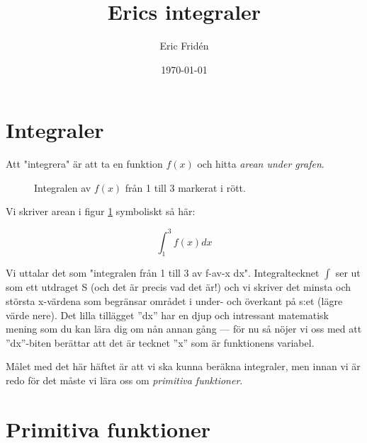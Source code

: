 \documentclass[a4paper,12pt]{article}
\title{Erics integraler}
\author{Eric Fridén}
\date{\today}
\begin{document}
\doublespacing
\maketitle

\section{Integraler}
Att "integrera" är att ta en funktion $f(x)$ och hitta \emph{arean under grafen}. 

\begin{figure}[h]
    \centering
    \caption{Integralen av $f(x)$ från 1 till 3 markerat i rött.}
    \label{fig:1}
\end{figure}

Vi skriver arean i figur \ref{fig:1} symboliskt så här: 

\[ \int_1^3 f(x)dx \] 

Vi uttalar det som "integralen från 1 till 3 av f-av-x dx". Integraltecknet $\int$ ser ut som ett utdraget S (och det är precis vad det är!) och vi skriver det minsta och största x-värdena som begränsar området i under- och överkant på s:et (lägre värde nere). Det lilla tillägget ''dx'' har en djup och intressant matematisk mening som du kan lära dig om nån annan gång --- för nu så nöjer vi oss med att ''dx''-biten berättar att det är tecknet ''x'' som är funktionens variabel.

Målet med det här häftet är att vi ska kunna beräkna integraler, men innan vi är redo för det måste vi lära oss om \emph{primitiva funktioner}.

\section{Primitiva funktioner}
\end{document}
